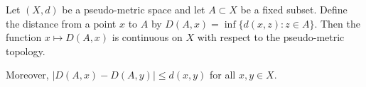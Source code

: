 Let $(X,d)$ be a pseudo-metric space and let $A \subset X$ be a fixed subset. Define the distance from a point $x$ to $A$ by $D(A,x) = \inf \{d(x,z) : z \in A\}$. Then the function $x \mapsto D(A,x)$ is continuous on $X$ with respect to the pseudo-metric topology.

Moreover, $|D(A,x) - D(A,y)| \leq d(x,y)$ for all $x,y \in X$.
